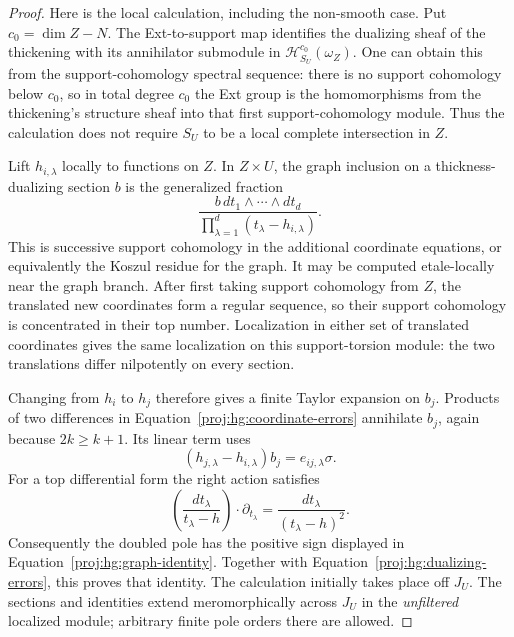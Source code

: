 \documentclass[11pt,letterpaper]{article}
\theoremstyle{definition}
\theoremstyle{remark}
\begin{document}
\begin{proof}
Here is the local calculation, including the non-smooth case.
Put \(c_0=\dim Z-N\).
The Ext-to-support map identifies the dualizing sheaf of the
thickening with its annihilator submodule in
\(\mathcal H^{c_0}_{S_U}(\omega_Z)\).  One can obtain this from
the support-cohomology spectral sequence: there is no support
cohomology below \(c_0\), so in total degree \(c_0\) the Ext
group is the homomorphisms from the thickening's structure sheaf
into that first support-cohomology module.  Thus the calculation
does not require \(S_U\) to be a local complete intersection in
\(Z\).

Lift \(h_{i,\lambda}\) locally to functions on \(Z\).  In
\(Z\times U\), the graph inclusion on a thickness-dualizing
section \(b\) is the generalized fraction
\[
 \frac{b\,dt_1\wedge\cdots\wedge dt_d}
      {\prod_{\lambda=1}^d(t_\lambda-h_{i,\lambda})}.
\]
This is successive support cohomology in the additional
coordinate equations, or equivalently the Koszul residue for
the graph.  It may be computed etale-locally near the graph
branch.  After first taking support cohomology from \(Z\), the
translated new coordinates form a regular sequence, so their
support cohomology is concentrated in their top number.
Localization in either set of translated coordinates gives the
same localization on this support-torsion module: the two
translations differ nilpotently on every section.

Changing from \(h_i\) to \(h_j\) therefore gives a finite Taylor
expansion on \(b_j\).  Products of two differences in
Equation~\eqref{proj:hg:coordinate-errors} annihilate \(b_j\), again
because \(2k\geq k+1\).  Its linear term uses
\[
 (h_{j,\lambda}-h_{i,\lambda})b_j
       =e_{ij,\lambda}\sigma.
\]
For a top differential form the right action satisfies
\[
 \left(\frac{dt_\lambda}{t_\lambda-h}\right)
       \cdot\partial_{t_\lambda}
   =\frac{dt_\lambda}{(t_\lambda-h)^2}.
\]
Consequently the doubled pole has the positive sign displayed in
Equation~\eqref{proj:hg:graph-identity}.  Together with
Equation~\eqref{proj:hg:dualizing-errors}, this proves that identity.
The calculation initially takes place off \(J_U\).  The sections
and identities extend meromorphically across \(J_U\) in the
\emph{unfiltered} localized module; arbitrary finite pole orders
there are allowed.


\end{proof}
\end{document}
